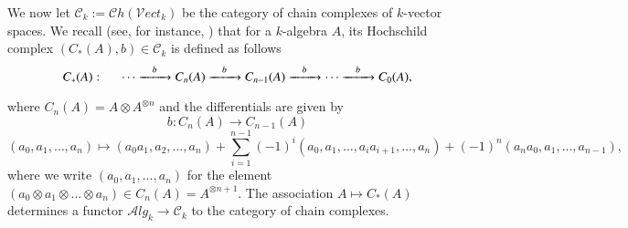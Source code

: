 \documentclass[10pt, colorlinks]{article}
\numberwithin{equation}{section} \DeclareMathSizes{2}{10}{12}{13}
\begin{document}
We now let $\mathcal C_{k}:=\mathcal Ch(\mathcal Vect_k)$ be the category of chain complexes of $k$-vector spaces. We recall (see, for instance, \cite[\S 1.1.3]{LD}) that for a $k$-algebra $A$, its Hochschild complex $(C_*(A),b)\in \mathcal C_k$ is defined as follows
\begin{equation}
    C_*(A):\hspace{.5cm}\cdots\xrightarrow[\qquad]{b}C_n(A)\xrightarrow[\qquad]{b}C_{n-1}(A)\xrightarrow[\qquad]{b}\cdots \xrightarrow[\qquad]{b}C_0(A),
\end{equation}
where $C_n(A)=A\otimes A^{\otimes n}$ and the differentials are given by $$b:C_n(A)\longrightarrow C_{n-1}(A)$$ 
\begin{equation}
(a_0,a_1,\ldots,a_n)
\longmapsto(a_0a_1,a_2,\ldots,a_n)
+ \sum_{i=1}^{n-1} (-1)^i (a_0,a_1,\ldots,a_i a_{i+1},\ldots,a_n)
+ (-1)^n (a_n a_0,a_1,\ldots,a_{n-1}),
\end{equation}
where we write $(a_0,a_1,\ldots,a_n)$ for the element $(a_0\otimes a_1\otimes ...\otimes a_n)\in C_n(A)=A^{\otimes n+1}$.  The association 
$A\mapsto C_*(A)$ determines a functor $\mathcal Alg_k\longrightarrow \mathcal C_k$ to the category of chain complexes.
\end{document}
